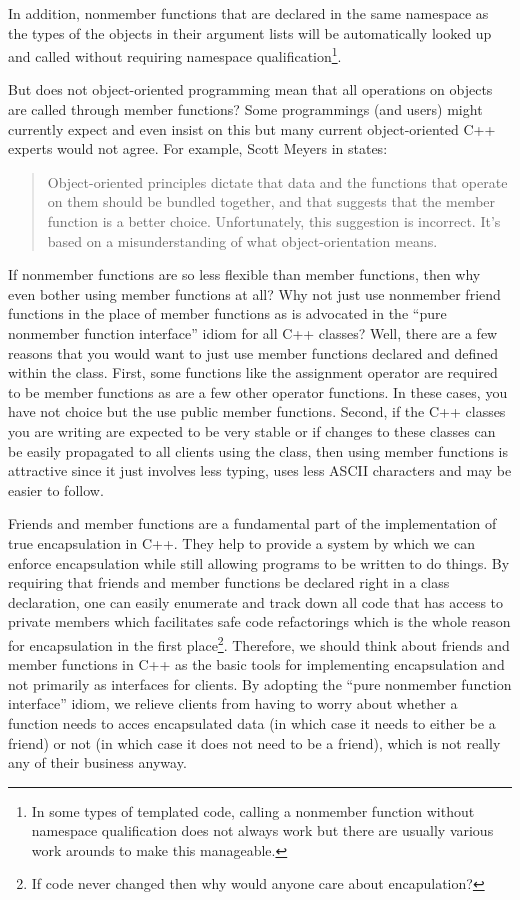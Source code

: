 \documentclass[pdf,ps2pdf,11pt]{SANDreport}
\begin{document}
In addition, nonmember functions that are declared in the same namespace as
the types of the objects in their argument lists will be automatically looked
up and called without requiring namespace qualification\footnote{In some types
of templated code, calling a nonmember function without namespace
qualification does not always work but there are usually various work arounds
to make this manageable.}.

But does not object-oriented programming mean that all operations on objects
are called through member functions?  Some programmings (and users) might
currently expect and even insist on this but many current object-oriented C++
experts would not agree.  For example, Scott Meyers in {}\cite[Item
23]{EffectiveC++3rd} states:

\begin{quote}

Object-oriented principles dictate that data and the functions that operate on
them should be bundled together, and that suggests that the member function is
a better choice.  Unfortunately, this suggestion is incorrect.  It's based on
a misunderstanding of what object-orientation means.

\end{quote}

If nonmember functions are so less flexible than member functions, then why
even bother using member functions at all?  Why not just use nonmember friend
functions in the place of member functions as is advocated in the ``pure
nonmember function interface'' idiom for all C++ classes?  Well, there are a
few reasons that you would want to just use member functions declared and
defined within the class.  First, some functions like the assignment operator
are required to be member functions as are a few other operator functions.  In
these cases, you have not choice but the use public member functions.  Second,
if the C++ classes you are writing are expected to be very stable or if
changes to these classes can be easily propagated to all clients using the
class, then using member functions is attractive since it just involves less
typing, uses less ASCII characters and may be easier to follow.

Friends and member functions are a fundamental part of the implementation of
true encapsulation in C++.  They help to provide a system by which we can
enforce encapsulation while still allowing programs to be written to do
things.  By requiring that friends and member functions be declared right in a
class declaration, one can easily enumerate and track down all code that has
access to private members which facilitates safe code refactorings which is
the whole reason for encapsulation in the first place\footnote{If code never
changed then why would anyone care about encapulation?}.  Therefore, we should
think about friends and member functions in C++ as the basic tools for
implementing encapsulation and not primarily as interfaces for clients.  By
adopting the ``pure nonmember function interface'' idiom, we relieve clients
from having to worry about whether a function needs to acces encapsulated data
(in which case it needs to either be a friend) or not (in which case it does
not need to be a friend), which is not really any of their business anyway.
\end{document}
